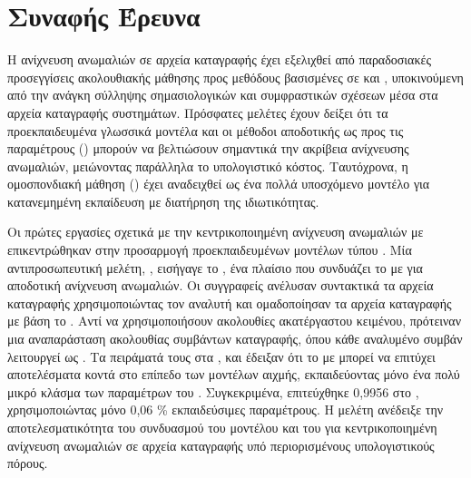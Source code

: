 \chapter{Συναφής Έρευνα}
Η ανίχνευση ανωμαλιών σε αρχεία καταγραφής έχει εξελιχθεί από παραδοσιακές προσεγγίσεις ακολουθιακής μάθησης προς μεθόδους βασισμένες σε  και , υποκινούμενη από την ανάγκη σύλληψης σημασιολογικών και συμφραστικών σχέσεων μέσα στα αρχεία καταγραφής συστημάτων. Πρόσφατες μελέτες έχουν δείξει ότι τα προεκπαιδευμένα γλωσσικά μοντέλα και οι μέθοδοι αποδοτικής ως προς τις παραμέτρους  () μπορούν να βελτιώσουν σημαντικά την ακρίβεια ανίχνευσης ανωμαλιών, μειώνοντας παράλληλα το υπολογιστικό κόστος. Ταυτόχρονα, η ομοσπονδιακή μάθηση () έχει αναδειχθεί ως ένα πολλά υποσχόμενο μοντέλο για κατανεμημένη εκπαίδευση με διατήρηση της ιδιωτικότητας.

Οι πρώτες εργασίες σχετικά με την κεντρικοποιημένη ανίχνευση ανωμαλιών με  επικεντρώθηκαν στην προσαρμογή προεκπαιδευμένων μοντέλων τύπου . Μία αντιπροσωπευτική μελέτη, , εισήγαγε το  \cite{cao2024parameter}, ένα πλαίσιο που συνδυάζει το  με  για αποδοτική ανίχνευση ανωμαλιών. Οι συγγραφείς ανέλυσαν συντακτικά τα αρχεία καταγραφής χρησιμοποιώντας τον αναλυτή  και ομαδοποίησαν τα αρχεία καταγραφής  με βάση το . Αντί να χρησιμοποιήσουν ακολουθίες ακατέργαστου κειμένου, πρότειναν μια αναπαράσταση ακολουθίας συμβάντων καταγραφής, όπου κάθε αναλυμένο συμβάν λειτουργεί ως . Τα πειράματά τους στα ,  και  έδειξαν ότι το  με  μπορεί να επιτύχει αποτελέσματα κοντά στο επίπεδο των μοντέλων αιχμής, εκπαιδεύοντας μόνο ένα πολύ μικρό κλάσμα των παραμέτρων του . Συγκεκριμένα, επιτεύχθηκε  0,9956 στο , χρησιμοποιώντας μόνο 0,06 \% εκπαιδεύσιμες παραμέτρους. Η μελέτη ανέδειξε την αποτελεσματικότητα του συνδυασμού του μοντέλου  και του  για κεντρικοποιημένη ανίχνευση ανωμαλιών σε αρχεία καταγραφής υπό περιορισμένους υπολογιστικούς πόρους.

